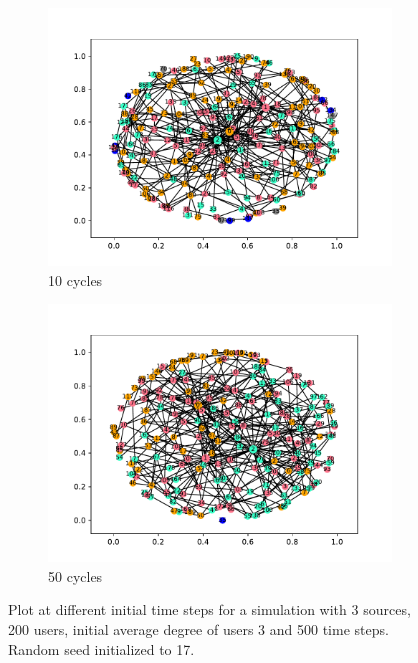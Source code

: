 \begin{figure}[htpb]
  \begin{subfigure}[t]{.45\textwidth}
    \centering
    \includegraphics[trim={1cm .5cm 1cm 1cm}, clip, width=\linewidth]{img/pdf/plot-0010.pdf} 
    \caption{10 cycles}
    \label{fig:10}
  \end{subfigure}
  \begin{subfigure}[t]{.45\textwidth}
    \centering
    \includegraphics[trim={1cm .5cm 1cm 1cm}, clip, width=\linewidth]{img/pdf/plot-0050.pdf} 
    \caption{50 cycles}
    \label{fig:50}
  \end{subfigure}
 
  \caption{Plot at different initial time steps for a simulation with 3 sources, 200 users, initial average degree of users 3 and 500 time steps. Random seed initialized to 17.}
\end{figure}
